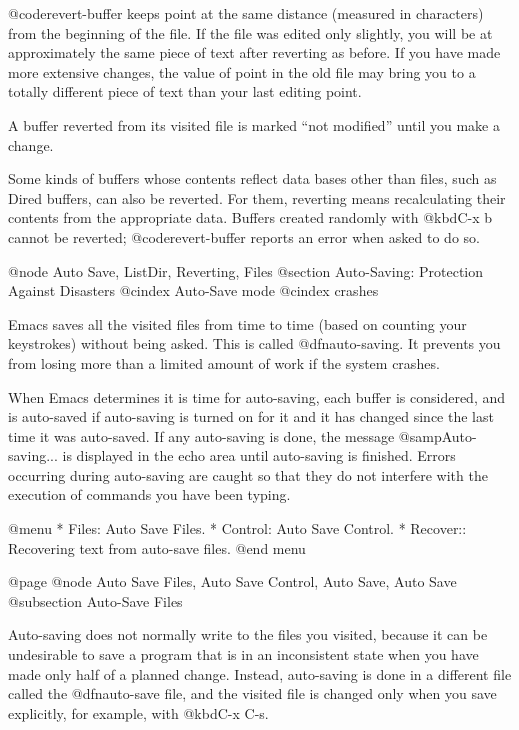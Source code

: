 {{{{{{{{{{{{{{{{{  @code{revert-buffer} keeps point at the same distance (measured in
characters) from the beginning of the file.  If the file was edited only
slightly, you will be at approximately the same piece of text after
reverting as before.  If you have made more extensive changes, the value of
point in the old file may bring you to a totally different piece of text
than your last editing point.

A buffer reverted from its visited file is marked ``not modified'' until
you make a change.

  Some kinds of buffers whose contents reflect data bases other than files,
such as Dired buffers, can also be reverted.  For them, reverting means
recalculating their contents from the appropriate data.  Buffers
created randomly with @kbd{C-x b} cannot be reverted; @code{revert-buffer}
reports an error when asked to do so.

@node Auto Save, ListDir, Reverting, Files
@section Auto-Saving: Protection Against Disasters
@cindex Auto-Save mode
@cindex crashes

  Emacs saves all the visited files from time to time (based on counting
your keystrokes) without being asked.  This is called @dfn{auto-saving}.
It prevents you from losing more than a limited amount of work if the
system crashes.

  When Emacs determines it is time for auto-saving, each buffer is
considered, and is auto-saved if auto-saving is turned on for it and it has
changed since the last time it was auto-saved.  If any auto-saving is
done, the message @samp{Auto-saving...} is displayed in the echo area until
auto-saving is finished.  Errors occurring during auto-saving are caught
so that they do not interfere with the execution of commands you have been
typing.

@menu
* Files: Auto Save Files.
* Control: Auto Save Control.
* Recover::		Recovering text from auto-save files.
@end menu

@page
@node Auto Save Files, Auto Save Control, Auto Save, Auto Save
@subsection Auto-Save Files

  Auto-saving does not normally write to the files you visited, because
it can be undesirable to save a program that is in an inconsistent
state when you have made only half of a planned change.  Instead, auto-saving
is done in a different file called the @dfn{auto-save file}, and the
visited file is changed only when you save explicitly, for example, 
with @kbd{C-x C-s}.

}}}}}}}}}}}}}}}}}
